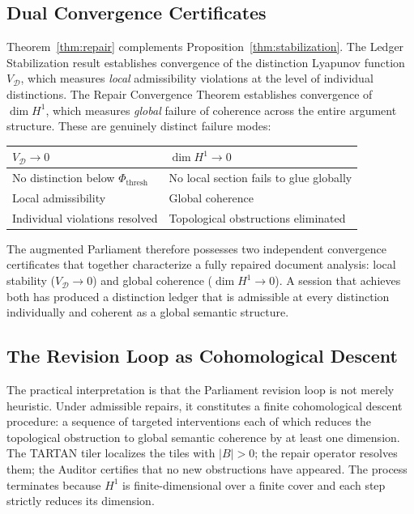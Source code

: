 \documentclass[12pt, a4paper]{article}
\theoremstyle{plain}
\theoremstyle{definition}
\theoremstyle{remark}
\begin{document}
\subsection{Dual Convergence Certificates}

Theorem~\ref{thm:repair} complements Proposition~\ref{thm:stabilization}. The Ledger Stabilization result establishes convergence of the distinction Lyapunov function $V_\mathcal{D}$, which measures \emph{local} admissibility violations at the level of individual distinctions. The Repair Convergence Theorem establishes convergence of $\dim H^1$, which measures \emph{global} failure of coherence across the entire argument structure. These are genuinely distinct failure modes:

\begin{center}
\renewcommand{\arraystretch}{1.35}
\begin{tabular}{p{4.5cm} p{4.5cm}}
\toprule
$V_\mathcal{D} \to 0$ & $\dim H^1 \to 0$ \\
\midrule
No distinction below $\Phi_\mathrm{thresh}$ & No local section fails to glue globally \\
Local admissibility & Global coherence \\
Individual violations resolved & Topological obstructions eliminated \\
\bottomrule
\end{tabular}
\end{center}

The augmented Parliament therefore possesses two independent convergence certificates that together characterize a fully repaired document analysis: local stability ($V_\mathcal{D} \to 0$) and global coherence ($\dim H^1 \to 0$). A session that achieves both has produced a distinction ledger that is admissible at every distinction individually and coherent as a global semantic structure.

\subsection{The Revision Loop as Cohomological Descent}

The practical interpretation is that the Parliament revision loop is not merely heuristic. Under admissible repairs, it constitutes a finite cohomological descent procedure: a sequence of targeted interventions each of which reduces the topological obstruction to global semantic coherence by at least one dimension. The TARTAN tiler localizes the tiles with $|B| > 0$; the repair operator resolves them; the Auditor certifies that no new obstructions have appeared. The process terminates because $H^1$ is finite-dimensional over a finite cover and each step strictly reduces its dimension.
\end{document}
